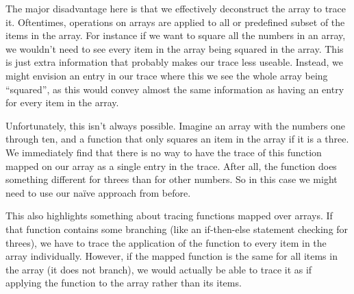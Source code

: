         The major disadvantage here is that we effectively deconstruct the array to trace it.
        Oftentimes, operations on arrays are applied to all or predefined subset of the items in the array.
        For instance if we want to square all the numbers in an array, we wouldn't need to see every item in the array being squared in the array.
        This is just extra information that probably makes our trace less useable.
        Instead, we might envision an entry in our trace where this we see the whole array being ``squared'', as this would convey almost the same information as having an entry for every item in the array.
        
        Unfortunately, this isn't always possible.
        Imagine an array with the numbers one through ten, and a function that only squares an item in the array if it is a three.
        We immediately find that there is no way to have the trace of this function mapped on our array as a single entry in the trace.
        After all, the function does something different for threes than for other numbers.
        So in this case we might need to use our naïve approach from before.

        This also highlights something about tracing functions mapped over arrays.
        If that function contains some branching (like an if-then-else statement checking for threes), we have to trace the application of the function to every item in the array individually.
        However, if the mapped function is the same for all items in the array (it does not branch), we would actually be able to trace it as if applying the function to the array rather than its items.

